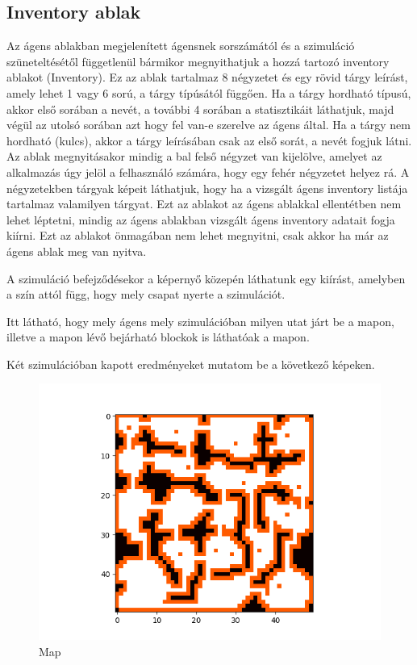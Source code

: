 \subsection{Inventory ablak}
Az ágens ablakban megjelenített ágensnek sorszámától és a szimuláció szüneteltésétől függetlenül bármikor megnyithatjuk a hozzá tartozó inventory ablakot (Inventory).
Ez az ablak tartalmaz 8 négyzetet és egy rövid tárgy leírást, amely lehet 1 vagy 6 sorú, a tárgy típúsától függően. Ha a tárgy hordható típusú, akkor első sorában a nevét, 
a további 4 sorában a statisztikáit láthatjuk, majd végül az utolsó sorában azt hogy fel van-e szerelve az ágens által. Ha a tárgy nem hordható (kulcs), 
akkor a tárgy leírásában csak az első sorát, a nevét fogjuk látni.
Az ablak megnyitásakor mindig a bal felső négyzet van kijelölve, amelyet az alkalmazás úgy jelöl a felhasználó számára, hogy egy fehér négyzetet helyez rá.
A négyzetekben tárgyak képeit láthatjuk, hogy ha a vizsgált ágens inventory listája tartalmaz valamilyen tárgyat.
Ezt az ablakot az ágens ablakkal ellentétben nem lehet léptetni, mindig az ágens ablakban vizsgált ágens inventory adatait fogja kiírni.
Ezt az ablakot önmagában nem lehet megnyitni, csak akkor ha már az ágens ablak meg van nyitva.


A szimuláció befejződésekor a képernyő közepén láthatunk egy kiírást, amelyben a szín attól függ, hogy mely csapat nyerte a szimulációt.


Itt látható, hogy mely ágens mely szimulációban milyen utat járt be a mapon, illetve a mapon lévő bejárható blockok is láthatóak a mapon.

Két szimulációban kapott eredményeket mutatom be a következő képeken.

\begin{figure}[!ht]
	\centering
	\includegraphics[scale=0.8]{images/map.png}
	\caption{Map}
	\label{fig:map}
\end{figure}

